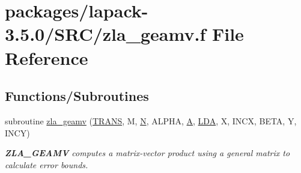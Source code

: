 \hypertarget{zla__geamv_8f}{}\section{packages/lapack-\/3.5.0/\+S\+R\+C/zla\+\_\+geamv.f File Reference}
\label{zla__geamv_8f}
\subsection*{Functions/\+Subroutines}
\begin{DoxyCompactItemize}
\item 
subroutine \hyperlink{group__complex16GEcomputational_ga1e2dcac0e299d54a42d42a0ae39aec60}{zla\+\_\+geamv} (\hyperlink{superlu__enum__consts_8h_a0c4e17b2d5cea33f9991ccc6a6678d62a1f61e3015bfe0f0c2c3fda4c5a0cdf58}{T\+R\+A\+N\+S}, M, \hyperlink{polmisc_8c_a0240ac851181b84ac374872dc5434ee4}{N}, A\+L\+P\+H\+A, \hyperlink{classA}{A}, \hyperlink{example__user_8c_ae946da542ce0db94dced19b2ecefd1aa}{L\+D\+A}, X, I\+N\+C\+X, B\+E\+T\+A, Y, I\+N\+C\+Y)
\begin{DoxyCompactList}\small\item\em {\bfseries Z\+L\+A\+\_\+\+G\+E\+A\+M\+V} computes a matrix-\/vector product using a general matrix to calculate error bounds. \end{DoxyCompactList}\end{DoxyCompactItemize}

